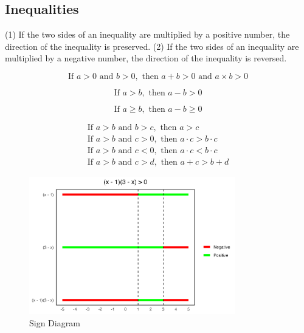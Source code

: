 \documentclass{article}
\begin{document}
\subsection{Inequalities}

(1) If the two sides of an inequality are multiplied by a positive number, the direction of the inequality is preserved.
(2) If the two sides of an inequality are multiplied by a negative number, the direction of the inequality is reversed.

\begin{equation}
 \text{If } a > 0 \text{ and } b > 0, \text{ then } a + b > 0 \text{ and } a \times b > 0
\end{equation}

\begin{equation}
 \text{If } a > b, \text{ then } a - b > 0
\end{equation}

\begin{equation}
 \text{If } a \geq b, \text{ then } a - b \geq 0
\end{equation}

\begin{align}
 \text{If } a > b \text{ and } b > c, \text{ then } a > c \\
 \text{If } a > b \text{ and } c > 0, \text{ then } a \cdot c > b \cdot c \\
 \text{If } a > b \text{ and } c < 0, \text{ then } a \cdot c < b \cdot c \\
 \text{If } a > b \text{ and } c > d, \text{ then } a + c > b + d
\end{align} 

\begin{figure}[h]
\centering
\includegraphics[width=0.8\textwidth]{Sign_Diagram.png}
\caption{Sign Diagram}
\end{figure}
\end{document}

